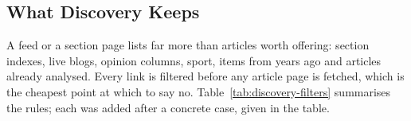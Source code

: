 
\subsection{What Discovery Keeps}
\label{subsec:scraping-filters}

A feed or a section page lists far more than articles worth offering:
section indexes, live blogs, opinion columns, sport, items from years
ago and articles already analysed. Every link is filtered before any
article page is fetched, which is the cheapest point at which to say
no. Table~\ref{tab:discovery-filters} summarises the rules; each was
added after a concrete case, given in the table.

